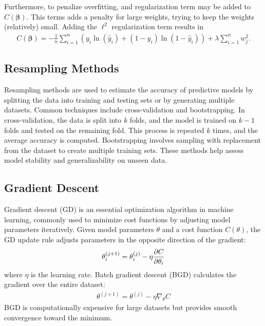 \documentclass[%
reprint,s
amsmath,amssymb,
aps,
]{revtex4-2}
\begin{document}
Furthermore, to penalize overfitting, and regularization term may be added to \(C(\bm\beta)\). This terms adds a penalty for large weights, trying to keep the weights (relatively) small. Adding the \(\ell^2\) regularization term results in 
\begin{align}
	C(\bm\beta)=-\frac1n\sum_{i=1}^n\left(y_i \ln(\hat y_i)+(1-y_i)\ln(1-\hat y_i) \right) + \lambda\sum\limits_{i=1}^{n}w_{j}^{2}.
\end{align}

\subsection{Resampling Methods}
Resampling methods are used to estimate the accuracy of predictive models by splitting the data into training and testing sets or by generating multiple datasets. Common techniques include cross-validation and bootstrapping. In cross-validation, the data is split into $k$ folds, and the model is trained on $k-1$ folds and tested on the remaining fold. This process is repeated $k$ times, and the average accuracy is computed. Bootstrapping involves sampling with replacement from the dataset to create multiple training sets. These methods help assess model stability and generalizability on unseen data.

\subsection{Gradient Descent}	\label{sec:gradient_descent}
Gradient descent (GD) is an essential optimization algorithm in machine learning, commonly used to minimize cost functions by adjusting model parameters iteratively. Given model parameters $\theta$ and a cost function $C(\theta)$, the GD update rule adjusts parameters in the opposite direction of the gradient:
\begin{align}
	\theta_i^{(j+1)}=\theta_i^{(j)}-\eta\pdv{C}{\theta_i}
\end{align}
where $\eta$ is the learning rate. Batch gradient descent (BGD) calculates the gradient over the entire dataset:
\begin{align}
	\theta^{(j+1)}=\theta^{(j)}-\eta\nabla_\theta C
\end{align}
BGD is computationally expensive for large datasets but provides smooth convergence toward the minimum.
\end{document}
